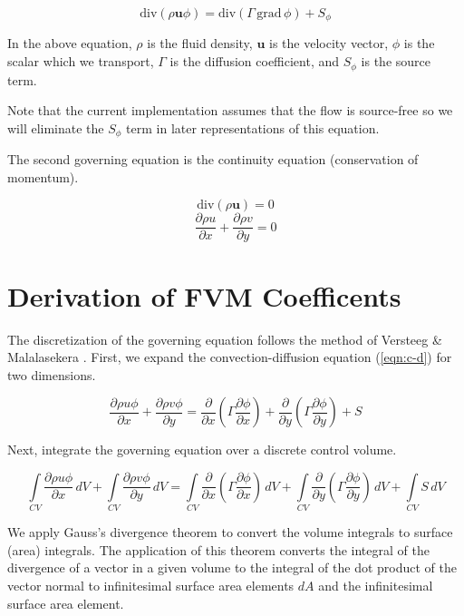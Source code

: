 \documentclass{article}
\newcommand{\dby}[2]{\frac{\partial #1}{\partial #2}}
\newcommand{\intb}[1]{\int\limits_{#1}}
\newcommand{\lp}{\left(}
\newcommand{\rp}{\right)}
\newcommand{\divc}[1]{\mathrm{div}\!\left(#1\right)}
\begin{document}
\begin{equation}
   \divc{\rho \mathbf{u} \phi} = \divc{\Gamma \, \mathrm{grad}\, \phi} + S_{\phi}
   \label{eqn:c-d}
\end{equation}

In the above equation, $\rho$ is the fluid density, $\mathbf{u}$ is the velocity vector, $\phi$ is the scalar which we transport, $\Gamma$ is the diffusion coefficient, and $S_{\phi}$ is the source term.

Note that the current implementation assumes that the flow is source-free so we will eliminate the $S_{\phi}$ term in later representations of this equation.


The second governing equation is the continuity equation (conservation of momentum).

\begin{equation}
   \divc{\rho \mathbf{u}} = 0
\end{equation}
\begin{equation}
   \dby{\rho u}{x} + \dby{\rho v}{y} = 0
\end{equation}

\section{Derivation of FVM Coefficents}
The discretization of the governing equation follows the method of Versteeg \& Malalasekera \cite{introcfdfvm}. First, we expand the convection-diffusion equation (\ref{eqn:c-d}) for two dimensions.

\begin{equation}
   \dby{\rho u \phi}{x} + \dby{\rho v \phi}{y} = \dby{}{x} \lp \Gamma \dby{\phi}{x} \rp + \dby{}{y} \lp \Gamma \dby{\phi}{y} \rp + S
\end{equation}

Next, integrate the governing equation over a discrete control volume.

\begin{equation}
   \intb{CV} \dby{\rho u \phi}{x}\,dV + \intb{CV} \dby{\rho v \phi}{y}\,dV =\intb{CV} \dby{}{x} \lp \Gamma \dby{\phi}{x} \rp\,dV + \intb{CV} \dby{}{y} \lp \Gamma \dby{\phi}{y} \rp\,dV + \intb{CV} S\,dV
\end{equation}

We apply Gauss's divergence theorem to convert the volume integrals to surface (area) integrals. The application of this theorem converts the integral of the divergence of a vector in a given volume to the integral of the dot product of the vector normal to infinitesimal surface area elements $dA$ and the infinitesimal surface area element. 
\end{document}
